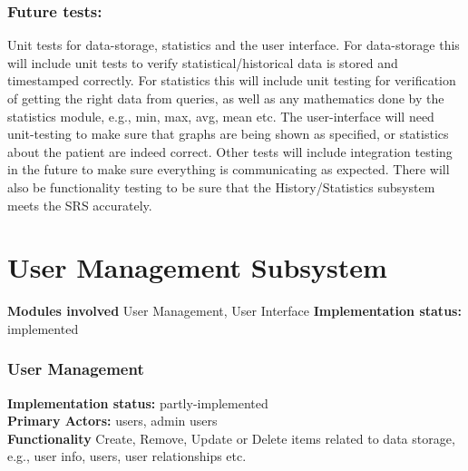 \documentclass[12pt]{article}
\begin{document}
{	\subsubsection{Future tests:} Unit tests for data-storage, statistics and the user interface. For data-storage this will include unit tests to verify statistical/historical data is stored and timestamped correctly. For statistics this will include unit testing for verification of getting the right data from queries, as well as any mathematics done by the statistics module, e.g., min, max, avg, mean etc. The user-interface will need unit-testing to make sure that graphs are being shown as specified, or statistics about the patient are indeed correct. Other tests will include integration testing in the future to make sure everything is communicating as expected. There will also be functionality testing to be sure that the History/Statistics subsystem meets the SRS accurately. 

	\section{User Management Subsystem }
	\textbf{Modules involved} User Management, User Interface
	\textbf{Implementation status:} implemented


	\subsubsection{User Management}

	\textbf{Implementation status:} partly-implemented \\
	\textbf{Primary Actors:} users, admin users \\
	\textbf{Functionality} Create, Remove, Update or Delete items related to data storage, e.g., user info, users, user relationships etc.  \\
}
\end{document}
